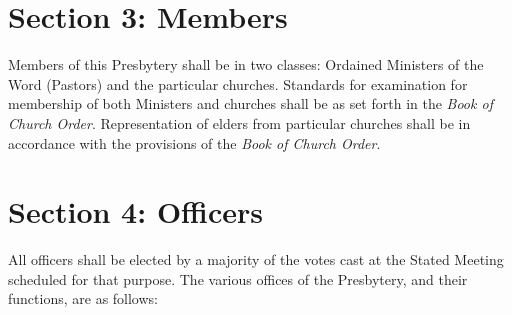 \documentclass[
]{book}
\begin{document}
\hypertarget{section-3-members}{%
\section*{Section 3: Members}\label{section-3-members}}

Members of this Presbytery shall be in two classes: Ordained Ministers of the Word (Pastors) and the particular churches. Standards for examination for membership of both Ministers and churches shall be as set forth in the \emph{Book of Church Order}. Representation of elders from particular churches shall be in accordance with the provisions of the \emph{Book of Church Order}.

\hypertarget{section-4-officers}{%
\section*{Section 4: Officers}\label{section-4-officers}}

All officers shall be elected by a majority of the votes cast at the Stated Meeting scheduled for that purpose. The various offices of the Presbytery, and their functions, are as follows:
\end{document}
